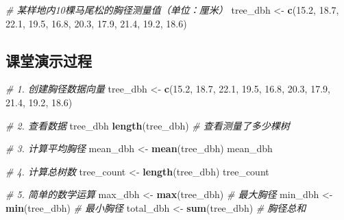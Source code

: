 \documentclass[
]{book}
\newenvironment{Shaded}{\begin{snugshade}}{\end{snugshade}}
\newcommand{\CommentTok}[1]{\textcolor[rgb]{0.56,0.35,0.01}{\textit{#1}}}
\newcommand{\FloatTok}[1]{\textcolor[rgb]{0.00,0.00,0.81}{#1}}
\newcommand{\FunctionTok}[1]{\textcolor[rgb]{0.13,0.29,0.53}{\textbf{#1}}}
\newcommand{\NormalTok}[1]{#1}
\newcommand{\OtherTok}[1]{\textcolor[rgb]{0.56,0.35,0.01}{#1}}
\begin{document}
\begin{Shaded}
\begin{Highlighting}[]
\CommentTok{\# 某样地内10棵马尾松的胸径测量值（单位：厘米）}
\NormalTok{tree\_dbh }\OtherTok{\textless{}{-}} \FunctionTok{c}\NormalTok{(}\FloatTok{15.2}\NormalTok{, }\FloatTok{18.7}\NormalTok{, }\FloatTok{22.1}\NormalTok{, }\FloatTok{19.5}\NormalTok{, }\FloatTok{16.8}\NormalTok{, }\FloatTok{20.3}\NormalTok{, }\FloatTok{17.9}\NormalTok{, }\FloatTok{21.4}\NormalTok{, }\FloatTok{19.2}\NormalTok{, }\FloatTok{18.6}\NormalTok{)}
\end{Highlighting}
\end{Shaded}

\hypertarget{ux8bfeux5802ux6f14ux793aux8fc7ux7a0b}{%
\subsection{课堂演示过程}\label{ux8bfeux5802ux6f14ux793aux8fc7ux7a0b}}

\begin{Shaded}
\begin{Highlighting}[]
\CommentTok{\# 1. 创建胸径数据向量}
\NormalTok{tree\_dbh }\OtherTok{\textless{}{-}} \FunctionTok{c}\NormalTok{(}\FloatTok{15.2}\NormalTok{, }\FloatTok{18.7}\NormalTok{, }\FloatTok{22.1}\NormalTok{, }\FloatTok{19.5}\NormalTok{, }\FloatTok{16.8}\NormalTok{, }\FloatTok{20.3}\NormalTok{, }\FloatTok{17.9}\NormalTok{, }\FloatTok{21.4}\NormalTok{, }\FloatTok{19.2}\NormalTok{, }\FloatTok{18.6}\NormalTok{)}

\CommentTok{\# 2. 查看数据}
\NormalTok{tree\_dbh}
\FunctionTok{length}\NormalTok{(tree\_dbh)  }\CommentTok{\# 查看测量了多少棵树}

\CommentTok{\# 3. 计算平均胸径}
\NormalTok{mean\_dbh }\OtherTok{\textless{}{-}} \FunctionTok{mean}\NormalTok{(tree\_dbh)}
\NormalTok{mean\_dbh}

\CommentTok{\# 4. 计算总树数}
\NormalTok{tree\_count }\OtherTok{\textless{}{-}} \FunctionTok{length}\NormalTok{(tree\_dbh)}
\NormalTok{tree\_count}

\CommentTok{\# 5. 简单的数学运算}
\NormalTok{max\_dbh }\OtherTok{\textless{}{-}} \FunctionTok{max}\NormalTok{(tree\_dbh)  }\CommentTok{\# 最大胸径}
\NormalTok{min\_dbh }\OtherTok{\textless{}{-}} \FunctionTok{min}\NormalTok{(tree\_dbh)  }\CommentTok{\# 最小胸径}
\NormalTok{total\_dbh }\OtherTok{\textless{}{-}} \FunctionTok{sum}\NormalTok{(tree\_dbh)  }\CommentTok{\# 胸径总和}
\end{Highlighting}
\end{Shaded}
\end{document}
